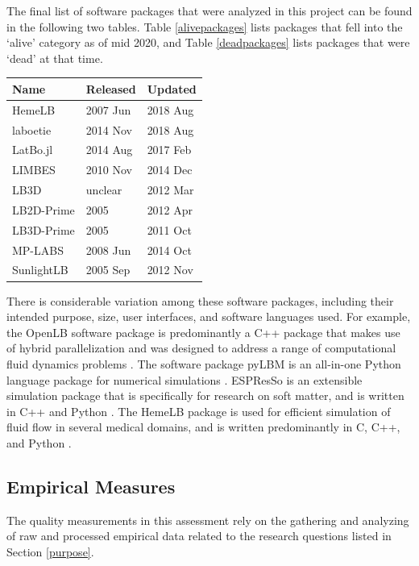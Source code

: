\documentclass[12pt, notitlepage]{article}
\begin{document}
The final list of software packages that were analyzed in this project can be found in the following two tables. Table \ref{alivepackages} lists packages that fell into the `alive' category as of mid 2020, and Table \ref{deadpackages} lists packages that were `dead' at that time. \\

\begin{center}
	\begin{tabular}{ p{4cm}p{3cm}p{3cm} }
		\hline
		Name & Released & Updated\\
		\hline
		HemeLB & 2007 Jun & 2018 Aug\\
		laboetie & 2014 Nov & 2018 Aug\\		
		LatBo.jl & 2014 Aug & 2017 Feb\\
		LIMBES & 2010 Nov & 2014 Dec\\
		LB3D & unclear & 2012 Mar\\
		LB2D-Prime & 2005 & 2012 Apr\\
		LB3D-Prime & 2005 & 2011 Oct\\
		MP-LABS & 2008 Jun & 2014 Oct\\
		SunlightLB & 2005 Sep & 2012 Nov\\
		\hline
	\end{tabular}
	\label{deadpackages}
\end{center}

There is considerable variation among these software packages, including their intended purpose, size, user interfaces, and software languages used. For example, the OpenLB software package is predominantly a C++ package that makes use of hybrid parallelization and was designed to address a range of computational fluid dynamics problems \citep{heuveline2009towards}. The software package pyLBM is an all-in-one Python language package for numerical simulations \citep{graille2017pylbm}. ESPResSo is an extensible simulation package that is specifically for research on soft matter, and is written in C++ and Python \citep{weik2019espresso}. The HemeLB package is used for efficient simulation of fluid flow in several medical domains, and is written predominantly in C, C++, and Python \citep{mazzeo2008hemelb}. 

\subsection{Empirical Measures}\label{empiricalmeasures}

The quality measurements in this assessment rely on the gathering and analyzing of raw and processed empirical data related to the research questions listed in Section \ref{purpose}. 
\end{document}

